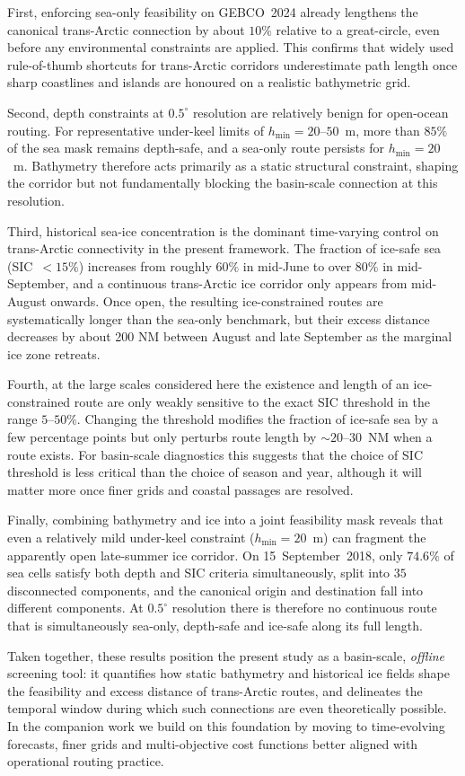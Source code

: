 First, enforcing sea-only feasibility on GEBCO~2024 already lengthens the canonical
trans-Arctic connection by about $10\%$ relative to a great-circle, even before
any environmental constraints are applied.  This confirms that widely used
rule-of-thumb shortcuts for trans-Arctic corridors underestimate path length once
sharp coastlines and islands are honoured on a realistic bathymetric grid.

Second, depth constraints at $0.5^{\circ}$ resolution are relatively benign for
open-ocean routing.  For representative under-keel limits of
$h_{\min}=20$--$50$~m, more than $85\%$ of the sea mask remains
depth-safe, and a sea-only route persists for $h_{\min}=20$~m.
Bathymetry therefore acts primarily as a static structural constraint, shaping
the corridor but not fundamentally blocking the basin-scale connection at this
resolution.

Third, historical sea-ice concentration is the dominant time-varying control on
trans-Arctic connectivity in the present framework.  The fraction of ice-safe
sea (SIC~$<15\%$) increases from roughly $60\%$ in mid-June to over $80\%$ in
mid-September, and a continuous trans-Arctic ice corridor only appears from
mid-August onwards.  Once open, the resulting ice-constrained routes are
systematically longer than the sea-only benchmark, but their excess distance
decreases by about 200 NM between August and late September as the
marginal ice zone retreats.

Fourth, at the large scales considered here the existence and length of an
ice-constrained route are only weakly sensitive to the exact SIC threshold in
the range $5$--$50\%$.  Changing the threshold modifies the fraction of
ice-safe sea by a few percentage points but only perturbs route length by
$\sim 20$–$30$~NM when a route exists.  For basin-scale diagnostics this suggests
that the choice of SIC threshold is less critical than the choice of season and
year, although it will matter more once finer grids and coastal passages are
resolved.

Finally, combining bathymetry and ice into a joint feasibility mask reveals that
even a relatively mild under-keel constraint ($h_{\min}=20$~m) can fragment the
apparently open late-summer ice corridor.  On 15~September~2018, only
$74.6\%$ of sea cells satisfy both depth and SIC criteria simultaneously, split
into $35$ disconnected components, and the canonical origin and destination fall
into different components.  At $0.5^{\circ}$ resolution there is therefore no
continuous route that is simultaneously sea-only, depth-safe and ice-safe along
its full length.

Taken together, these results position the present study as a basin-scale,
\emph{offline} screening tool: it quantifies how static bathymetry and
historical ice fields shape the feasibility and excess distance of trans-Arctic
routes, and delineates the temporal window during which such connections are
even theoretically possible.  In the companion work we build on this foundation
by moving to time-evolving forecasts, finer grids and multi-objective cost
functions better aligned with operational routing practice.